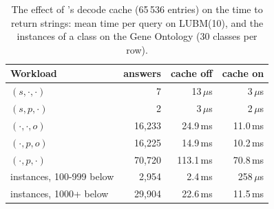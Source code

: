 \begin{table}[t]
\caption{The effect of \sys's decode cache (65\,536 entries) on the time to return strings: mean time per query on LUBM(10), and the instances of a class on the Gene Ontology (30 classes per row).}
\label{tab-cache}
\small
\begin{tabular}{@{}lrrr@{}}
\toprule
Workload & answers & cache off & cache on \\
\midrule
$(s,\cdot,\cdot)$ & 7 & 13\,$\mu$s & 3\,$\mu$s \\
$(s,p,\cdot)$ & 2 & 3\,$\mu$s & 2\,$\mu$s \\
$(\cdot,\cdot,o)$ & 16,233 & 24.9\,ms & 11.0\,ms \\
$(\cdot,p,o)$ & 16,225 & 14.9\,ms & 10.2\,ms \\
$(\cdot,p,\cdot)$ & 70,720 & 113.1\,ms & 70.8\,ms \\
\midrule
instances, 100-999 below & 2,954 & 2.4\,ms & 258\,$\mu$s \\
instances, 1000+ below & 29,904 & 22.6\,ms & 11.5\,ms \\
\bottomrule
\end{tabular}
\end{table}

